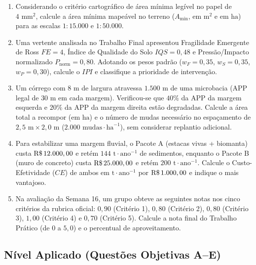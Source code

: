 \begin{enumerate}[leftmargin=1.8em, itemsep=6pt, resume]
  \item Considerando o critério cartográfico de área mínima legível no papel de $4\text{ mm}^2$, calcule a área mínima mapeável no terreno ($A_{\min}$, em $\text{m}^2$ e em $\text{ha}$) para as escalas $1:15.000$ e $1:50.000$.
  \espacoResolucao[2.2cm]

  \item Uma vertente analisada no Trabalho Final apresentou Fragilidade Emergente de Ross $FE = 4$, Índice de Qualidade do Solo $IQS = 0{,}48$ e Pressão/Impacto normalizado $P_{\text{norm}} = 0{,}80$. Adotando os pesos padrão ($w_F = 0{,}35$, $w_S = 0{,}35$, $w_P = 0{,}30$), calcule o $IPI$ e classifique a prioridade de intervenção.
  \espacoResolucao[2.2cm]

  \item Um córrego com $8\text{ m}$ de largura atravessa $1.500\text{ m}$ de uma microbacia (APP legal de $30\text{ m}$ em cada margem). Verificou-se que $40\%$ da APP da margem esquerda e $20\%$ da APP da margem direita estão degradadas. Calcule a área total a recompor (em $\text{ha}$) e o número de mudas necessário no espaçamento de $2{,}5\text{ m} \times 2{,}0\text{ m}$ ($2.000\text{ mudas}\cdot\text{ha}^{-1}$), sem considerar replantio adicional.
  \espacoResolucao[2.2cm]

  \item Para estabilizar uma margem fluvial, o Pacote A (estacas vivas + biomanta) custa $\text{R\$\,}{12.000,00}$ e retém $144\text{ t}\cdot\text{ano}^{-1}$ de sedimentos, enquanto o Pacote B (muro de concreto) custa $\text{R\$\,}{25.000,00}$ e retém $200\text{ t}\cdot\text{ano}^{-1}$. Calcule o Custo-Efetividade ($CE$) de ambos em $\text{t}\cdot\text{ano}^{-1}$ por $\text{R\$\,}{1.000,00}$ e indique o mais vantajoso.
  \espacoResolucao[2.2cm]

  \item Na avaliação da Semana 16, um grupo obteve as seguintes notas nos cinco critérios da rubrica oficial: $0{,}90$ (Critério 1), $0{,}80$ (Critério 2), $0{,}80$ (Critério 3), $1{,}00$ (Critério 4) e $0{,}70$ (Critério 5). Calcule a nota final do Trabalho Prático (de $0$ a $5{,}0$) e o percentual de aproveitamento.
  \espacoResolucao[2.2cm]
\end{enumerate}

\subsection*{Nível Aplicado (Questões Objetivas A--E)}

